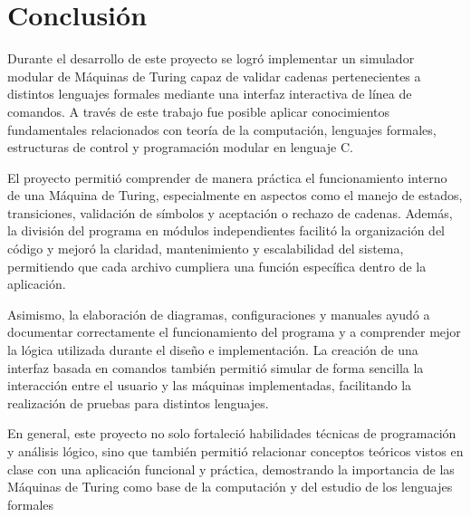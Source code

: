 \documentclass[../main.tex]{subfiles}
\begin{document}
    \section{Conclusión}
    Durante el desarrollo de este proyecto se logró implementar un simulador
    modular de Máquinas de Turing capaz de validar cadenas pertenecientes a
    distintos lenguajes formales mediante una interfaz interactiva de línea de
    comandos. A través de este trabajo fue posible aplicar conocimientos
    fundamentales relacionados con teoría de la computación, lenguajes formales,
    estructuras de control y programación modular en lenguaje C.

    El proyecto permitió comprender de manera práctica el funcionamiento interno de
    una Máquina de Turing, especialmente en aspectos como el manejo de estados,
    transiciones, validación de símbolos y aceptación o rechazo de cadenas. Además,
    la división del programa en módulos independientes facilitó la organización del
    código y mejoró la claridad, mantenimiento y escalabilidad del sistema,
    permitiendo que cada archivo cumpliera una función específica dentro de la aplicación.

    Asimismo, la elaboración de diagramas, configuraciones y manuales ayudó a
    documentar correctamente el funcionamiento del programa y a comprender mejor la
    lógica utilizada durante el diseño e implementación. La creación de una
    interfaz basada en comandos también permitió simular de forma sencilla la
    interacción entre el usuario y las máquinas implementadas, facilitando la
    realización de pruebas para distintos lenguajes.

    En general, este proyecto no solo fortaleció habilidades técnicas de
    programación y análisis lógico, sino que también permitió relacionar conceptos
    teóricos vistos en clase con una aplicación funcional y práctica, demostrando
    la importancia de las Máquinas de Turing como base de la computación y del
    estudio de los lenguajes formales
    
\end{document}
